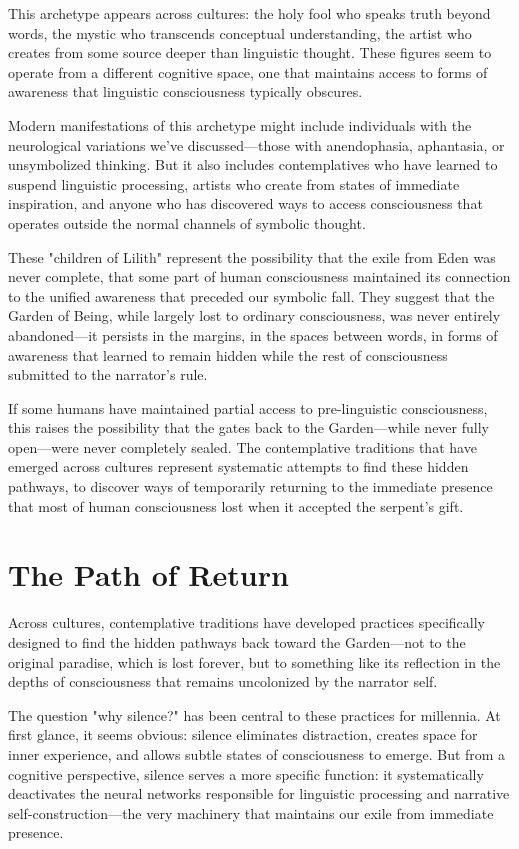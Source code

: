 This archetype appears across cultures: the holy fool who speaks truth beyond words, the mystic who transcends conceptual understanding, the artist who creates from some source deeper than linguistic thought. These figures seem to operate from a different cognitive space, one that maintains access to forms of awareness that linguistic consciousness typically obscures.

Modern manifestations of this archetype might include individuals with the neurological variations we've discussed—those with anendophasia, aphantasia, or unsymbolized thinking. But it also includes contemplatives who have learned to suspend linguistic processing, artists who create from states of immediate inspiration, and anyone who has discovered ways to access consciousness that operates outside the normal channels of symbolic thought.

These "children of Lilith" represent the possibility that the exile from Eden was never complete, that some part of human consciousness maintained its connection to the unified awareness that preceded our symbolic fall. They suggest that the Garden of Being, while largely lost to ordinary consciousness, was never entirely abandoned—it persists in the margins, in the spaces between words, in forms of awareness that learned to remain hidden while the rest of consciousness submitted to the narrator's rule.

If some humans have maintained partial access to pre-linguistic consciousness, this raises the possibility that the gates back to the Garden—while never fully open—were never completely sealed. The contemplative traditions that have emerged across cultures represent systematic attempts to find these hidden pathways, to discover ways of temporarily returning to the immediate presence that most of human consciousness lost when it accepted the serpent's gift. \section{The Path of Return}

Across cultures, contemplative traditions have developed practices specifically designed to find the hidden pathways back toward the Garden—not to the original paradise, which is lost forever, but to something like its reflection in the depths of consciousness that remains uncolonized by the narrator self.

The question "why silence?" has been central to these practices for millennia. At first glance, it seems obvious: silence eliminates distraction, creates space for inner experience, and allows subtle states of consciousness to emerge. But from a cognitive perspective, silence serves a more specific function: it systematically deactivates the neural networks responsible for linguistic processing and narrative self-construction—the very machinery that maintains our exile from immediate presence.

